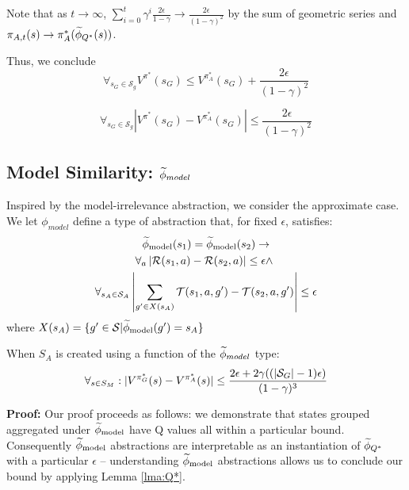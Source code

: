 Note that as $t \rightarrow \infty$, $\sum_{i=0}^{t}\gamma^i \frac{2\epsilon}{1-\gamma} \rightarrow \frac{2\epsilon}{(1-\gamma)^2}$ by the sum of geometric series and $\pi_{A,t}(s) \rightarrow \pi_A^*(\widetilde \phi_{Q^*}(s))$.

Thus, we conclude
\begin{equation*}
\forall_{s_G \in \mathcal{S}_g} V^{\pi^*}(s_G) \leq  V^{\pi_{A}^*}(s_G) + \frac{2\epsilon}{(1-\gamma)^2}
\end{equation*}

\begin{equation*}
\forall_{s_G \in \mathcal{S}_g} \left | V^{\pi^*}(s_G) - V^{\pi_{A}^*}(s_G) \right | \leq  \frac{2\epsilon}{(1-\gamma)^2}
\end{equation*}



\subsection{Model Similarity: $\widetilde \phi_{model}$}
\label{sec:model}

Inspired by the model-irrelevance abstraction, we consider the approximate case. We let $\phi_{model}$ define a type of abstraction that, for fixed $\epsilon$, satisfies:
\begin{multline}
\widetilde \phi_{\text{model}}(s_1) = \widetilde \phi_{\text{model}}(s_2) \rightarrow \\
\forall_a \left| \mathcal{R}(s_1, a) - \mathcal{R}(s_2, a)\right| \leq \epsilon \wedge\ \\
\forall_{s_A \in \mathcal{S}_A} \left|\sum_{g' \in X(s_A)}\mathcal{T}(s_1, a, g') - \mathcal{T}(s_2, a,g')\right| \leq \epsilon
\end{multline}
where $X(s_A) = \{ g' \in \mathcal{S} | \widetilde \phi_{\text{model}}(g') = s_A \}$



\begin{lma}
\label{lma:model}
When $S_A$ is created using a function of the $\widetilde \phi_{model}$ type:
\begin{equation}
\forall_{s \in S_M} : | V^{\pi^*_G}(s) - V^{\pi^*_{A}}(s) | \leq \frac{2\epsilon + 2\gamma((|\mathcal{S}_G|-1)\epsilon)}{(1-\gamma)^3}
\end{equation}
\end{lma}

{\bf Proof:} Our proof proceeds as follows: we demonstrate that states grouped aggregated under $\widetilde \phi_{\text{model}}$ have Q values all within a particular bound. Consequently $\widetilde \phi_{\text{model}}$ abstractions are interpretable as an instantiation of $\widetilde \phi_{Q^*}$ with a particular $\epsilon$ -- understanding $\widetilde \phi_{\text{model}}$ abstractions allows us to conclude our bound by applying Lemma \ref{lma:Q*}.


